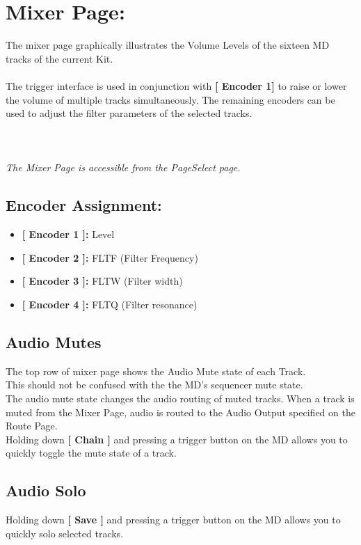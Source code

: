 \chapter{Mixer Page:}
The mixer page graphically illustrates the Volume Levels of the sixteen MD tracks of the current Kit.\\
\\
The trigger interface is used in conjunction with \textbf{[ Encoder 1]} to raise or lower the volume of multiple tracks simultaneously. The remaining encoders can be used to adjust the filter parameters of the selected tracks. \\
\\
\\\\
\textit{The Mixer Page is accessible from the PageSelect page.}
\section{Encoder Assignment:}
\begin{itemize}
	\item \textbf{[ Encoder 1 ]: } Level
	\item \textbf{[ Encoder 2 ]: } FLTF (Filter Frequency)
    \item \textbf{[ Encoder 3 ]: } FLTW (Filter width)
	\item \textbf{[ Encoder 4 ]: } FLTQ (Filter resonance)
\end{itemize}


\section{Audio Mutes}
The top row of mixer page shows the Audio Mute state of each Track. \\
This should not be confused with the the MD's sequencer mute state. \\The audio mute state changes the audio routing of muted tracks. When a track is muted from the Mixer Page, audio is routed to the Audio Output specified on the Route Page.
\\
Holding down \textbf{[ Chain ]} and pressing a trigger button on the MD allows you to quickly toggle the mute state of a track.\\
\section{Audio Solo}
Holding down \textbf{[ Save ]} and pressing a trigger button on the MD allows you to quickly solo selected tracks.
